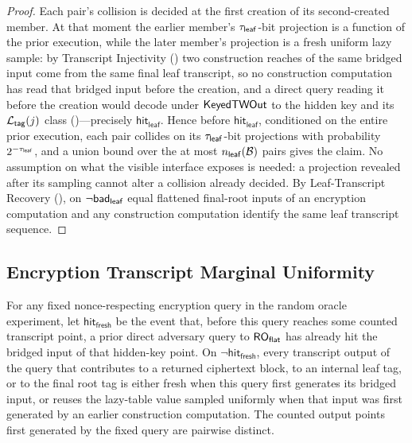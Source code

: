 \begin{proof}
Each pair's collision is decided at the first creation of its
second-created member. At that moment the earlier member's
$\tau_{\mathsf{leaf}}$-bit projection is a function of the prior execution, while
the later member's projection is a fresh uniform lazy sample: by
Transcript Injectivity () two construction
reaches of the same bridged input come from the same final leaf
transcript, so no construction computation has read that bridged input
before the creation, and a direct query reading it before the creation
would decode under $\mathsf{KeyedTWOut}$ to the hidden key and its $\mathcal{L}_{\mathsf{tag}}(j)$
class ()---precisely
$\mathsf{hit}_{\mathsf{leaf}}$. Hence before
$\mathsf{hit}_{\mathsf{leaf}}$, conditioned on the entire prior
execution, each pair collides on its $\tau_{\mathsf{leaf}}$-bit projections with
probability $2^{-\tau_{\mathsf{leaf}}}$, and a union bound over the at most
$n_{\mathsf{leaf}}(\mathcal{B})$ pairs gives the claim. No assumption on what the
visible interface exposes is needed: a projection revealed after its
sampling cannot alter a collision already decided. By Leaf-Transcript
Recovery (), on $\neg\mathsf{bad}_{\mathsf{leaf}}$ equal flattened
final-root inputs of an encryption computation and any construction
computation identify the same leaf transcript sequence.
\end{proof}

\subsection{Encryption Transcript Marginal Uniformity}
\label{app:enc-transcript-marginal-uniformity}

\begin{lemma}
\label{lem:enc-transcript-marginal-uniformity}
For any fixed nonce-respecting encryption query in the \TW{}
random oracle experiment, let $\mathsf{hit}_{\mathsf{fresh}}$ be the
event that, before this query reaches some counted transcript point,
a prior direct adversary query to $\mathsf{RO}_{\mathsf{flat}}$ has already hit the
bridged input of that hidden-key point. On
$\neg\mathsf{hit}_{\mathsf{fresh}}$, every transcript output of the
query that contributes to a returned ciphertext block, to an internal
leaf tag, or to the final root tag is either fresh when this query first
generates its bridged input, or reuses the lazy-table value sampled
uniformly when that input was first generated by an earlier construction
computation. The counted output points first generated by the fixed
query are pairwise distinct.
\end{lemma}

